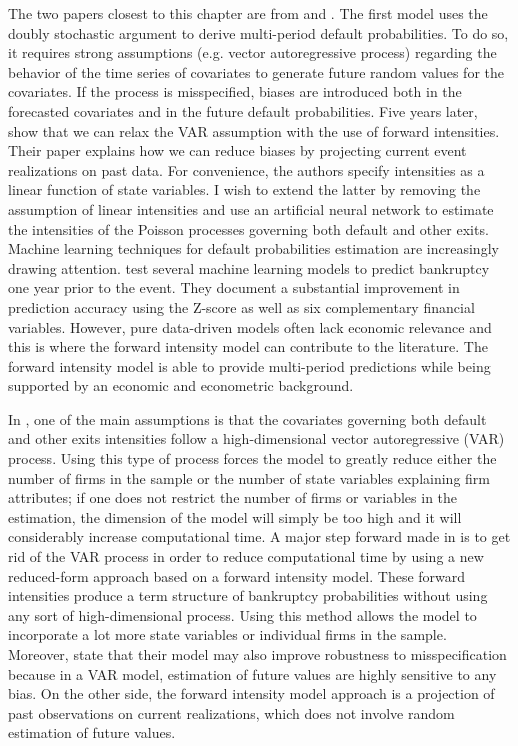 \clearpage
The two papers closest to this chapter are from \citet{DSW} and \citet{Duan2012}. The first model uses the doubly stochastic argument to derive multi-period default probabilities. To do so, it requires strong assumptions (e.g. vector autoregressive process) regarding the behavior of the time series of covariates to generate future random values for the covariates. If the process is misspecified, biases are introduced both in the forecasted covariates and in the future default probabilities. Five years later, \citet{Duan2012} show that we can relax the VAR assumption with the use of forward intensities. Their paper explains how we can reduce biases by projecting current event realizations on past data. For convenience, the authors specify intensities as a linear function of state variables. I wish to extend the latter by removing the assumption of linear intensities and use an artificial neural network to estimate the intensities of the Poisson processes governing both default and other exits. 
Machine learning techniques for default probabilities estimation are increasingly drawing attention. \citet{barboza2017machine} test several machine learning models to predict bankruptcy one year prior to the event. They document a substantial improvement in prediction accuracy using the Z-score as well as six complementary financial variables. However, pure data-driven models often lack economic relevance and this is where the forward intensity model can contribute to the literature. The forward intensity model is able to provide multi-period predictions while being supported by an economic and econometric background.

In \citet{DSW}, one of the main assumptions is that the covariates governing both default and other exits intensities follow a high-dimensional vector autoregressive (VAR) process. Using this type of process forces the model to greatly reduce either the number of firms in the sample or the number of state variables explaining firm attributes; if one does not restrict the number of firms or variables in the estimation, the dimension of the model will simply be too high and it will considerably increase computational time. A major step forward made in \citet{Duan2012} is to get rid of the VAR process in order to reduce computational time by using a new reduced-form approach based on a forward intensity model. These forward intensities produce a term structure of bankruptcy probabilities without using any sort of high-dimensional process. Using this method allows the model to incorporate a lot more state variables or individual firms in the sample. Moreover, \citet{Duan2012} state that their model may also improve robustness to misspecification because in a VAR model, estimation of future values are highly sensitive to any bias. On the other side, the forward intensity model approach is a projection of past observations on current realizations, which does not involve random estimation of future values. 

